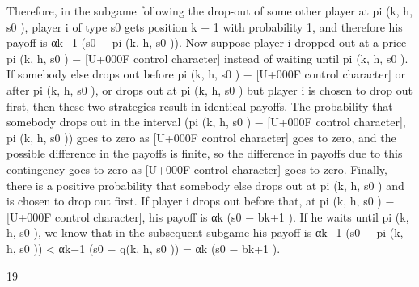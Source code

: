 \documentclass[10pt]{article}
\begin{document}
\begin{ReviewVerbatim}
Therefore, in the subgame following the drop-out of some other player at pi (k, h, s0 ), player i
of type s0 gets position k − 1 with probability 1, and therefore his payoff is αk−1 (s0 − pi (k, h, s0 )).
Now suppose player i dropped out at a price pi (k, h, s0 ) − [U+000F control character] instead of waiting until pi (k, h, s0 ).
If somebody else drops out before pi (k, h, s0 ) − [U+000F control character] or after pi (k, h, s0 ), or drops out at pi (k, h, s0 )
but player i is chosen to drop out first, then these two strategies result in identical payoffs. The
probability that somebody drops out in the interval (pi (k, h, s0 ) − [U+000F control character], pi (k, h, s0 )) goes to zero as [U+000F control character]
goes to zero, and the possible difference in the payoffs is finite, so the difference in payoffs due
to this contingency goes to zero as [U+000F control character] goes to zero. Finally, there is a positive probability that
somebody else drops out at pi (k, h, s0 ) and is chosen to drop out first. If player i drops out before
that, at pi (k, h, s0 ) − [U+000F control character], his payoff is αk (s0 − bk+1 ). If he waits until pi (k, h, s0 ), we know that in the
subsequent subgame his payoff is αk−1 (s0 − pi (k, h, s0 )) < αk−1 (s0 − q(k, h, s0 )) = αk (s0 − bk+1 ).

19



\end{ReviewVerbatim}
\end{document}
